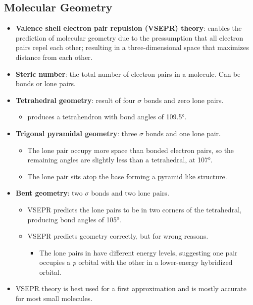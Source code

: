 \documentclass[12pt,a4paper]{article}
\begin{document}
\subsection{Molecular Geometry}
\begin{itemize}
    \item \textbf{Valence shell electron pair repulsion (VSEPR) theory}: enables the {\color{o-Sun}prediction of molecular geometry} due to the pressumption that all electron pairs repel each other; resulting in a three-dimensional space that {\color{o-Sun}maximizes distance} from each other.
    \item \textbf{Steric number}: the total number of electron pairs in a molecule. Can be bonds or lone pairs.
    \item \textbf{Tetrahedral geometry}: result of four $\sigma$ bonds and zero lone pairs. 
        \begin{itemize}
            \item produces a tetrahendron with bond angles of \ang{109.5}.
        \end{itemize}
    \item \textbf{Trigonal pyramidal geometry}: three $\sigma$ bonds and one lone pair.
        \begin{itemize}
            \item The lone pair occupy more space than bonded electron pairs, so the remaining angles are slightly less than a tetrahedral, at \ang{107}.
            \item The lone pair sits atop the base forming a pyramid like structure.
        \end{itemize}
    \item \textbf{Bent geometry}: two $\sigma$ bonds and two lone pairs.
        \begin{itemize}
            \item VSEPR predicts the lone pairs to be in two corners of the tetrahedral, producing bond angles of \ang{105}.
            \item VSEPR predicts geometry  correctly, but for wrong reasons.
                \begin{itemize}
                    \item The lone pairs in  have different energy levels, suggesting one pair occupies a \textit{p} orbital with the other in a lower-energy hybridized orbital.
                \end{itemize}
        \end{itemize}
    \item VSEPR theory is best used for a first approximation and is mostly accurate for most small molecules.

\end{itemize}
\end{document}
